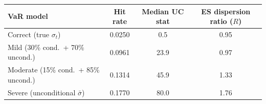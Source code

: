 \begin{tabular}{lccc}
\toprule
VaR model & Hit rate & Median UC stat & ES dispersion ratio ($R$) \\
\midrule
  Correct (true $\sigma_t$) & 0.0250 & 0.5 & 0.95 \\
  Mild (30\% cond.\ + 70\% uncond.) & 0.0961 & 23.9 & 0.97 \\
  Moderate (15\% cond.\ + 85\% uncond.) & 0.1314 & 45.9 & 1.33 \\
  Severe (unconditional $\bar{\sigma}$) & 0.1770 & 80.0 & 1.76 \\
\bottomrule
\end{tabular}